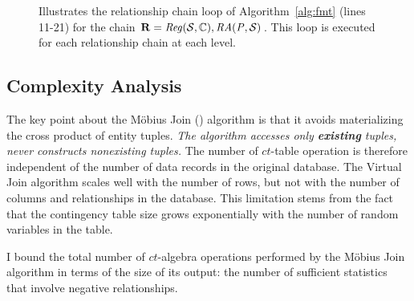 \documentclass{sfuthesis}
\newcommand{\ct}{\mathit{ct}}
\begin{document}
\begin{figure}[htbp]
\begin{center}
\caption{Illustrates the relationship chain loop of Algorithm~\ref{alg:fmt} (lines 11-21) for the chain $\mathbf{R}= \it{Reg}(\mathcal{S},\mathbb{C}),\mathit{RA}(P,\mathcal{S})$. This loop is executed for each relationship chain at each level.
\label{fig:rchain-loop}}
\end{center}
\end{figure}



\subsection{Complexity Analysis} \label{sec:complexity1} 

The key point about the M\"obius Join (\MJ) algorithm is that it avoids materializing the cross product of entity tuples. {\em The algorithm accesses  only \textbf{existing} tuples, never constructs nonexisting tuples.} The number of $\ct$-table operation is therefore independent of the number of data records in the original database. 
The Virtual Join algorithm scales well with the number of rows, but not with the number of columns and relationships in the database. This limitation stems from the fact that the contingency table size grows exponentially with the number of random variables in the table. 

I  bound the total number of $\ct$-algebra operations performed by the M\"obius Join algorithm in terms of the size of its output: the number of sufficient statistics that involve negative relationships. 
\end{document}
